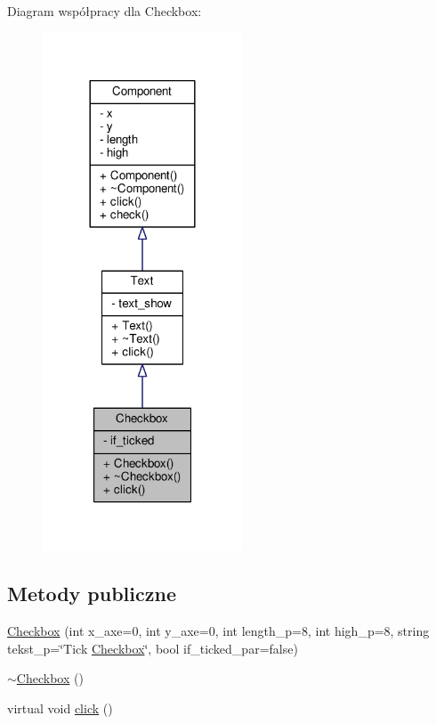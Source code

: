 Diagram współpracy dla Checkbox\+:\nopagebreak
\begin{figure}[H]
\begin{center}
\leavevmode
\includegraphics[width=168pt]{classCheckbox__coll__graph}
\end{center}
\end{figure}
\subsection*{Metody publiczne}
\begin{DoxyCompactItemize}
\item 
\hyperlink{classCheckbox_a44d2ffeb1990a715b7d99f7ad48d36cf}{Checkbox} (int x\+\_\+axe=0, int y\+\_\+axe=0, int length\+\_\+p=8, int high\+\_\+p=8, string tekst\+\_\+p=\char`\"{}Tick \hyperlink{classCheckbox}{Checkbox}\char`\"{}, bool if\+\_\+ticked\+\_\+par=false)
\item 
\hyperlink{classCheckbox_a828c1436e32c8be0d9d395286d8e6bfe}{$\sim$\+Checkbox} ()
\item 
virtual void \hyperlink{classCheckbox_afd75946a43da1dcba8e6f04f00df34ee}{click} ()
\end{DoxyCompactItemize}
